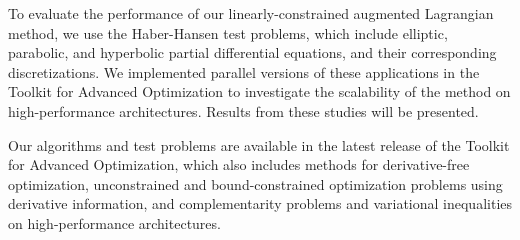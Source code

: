 \documentclass{report}
\begin{document}
To evaluate the performance of our linearly-constrained augmented Lagrangian
method, we use the Haber-Hansen test problems, which include elliptic,
parabolic, and hyperbolic partial differential equations, and their
corresponding discretizations. We implemented parallel versions of these
applications in
the Toolkit for Advanced Optimization to investigate the scalability
of the method on high-performance architectures. Results from these
studies will be presented.

Our algorithms and test problems are available in the latest release
of the Toolkit for Advanced Optimization, which also includes methods
for derivative-free optimization, unconstrained and bound-constrained
optimization problems using derivative information, and complementarity
problems and variational inequalities on high-performance architectures.
\end{document}

